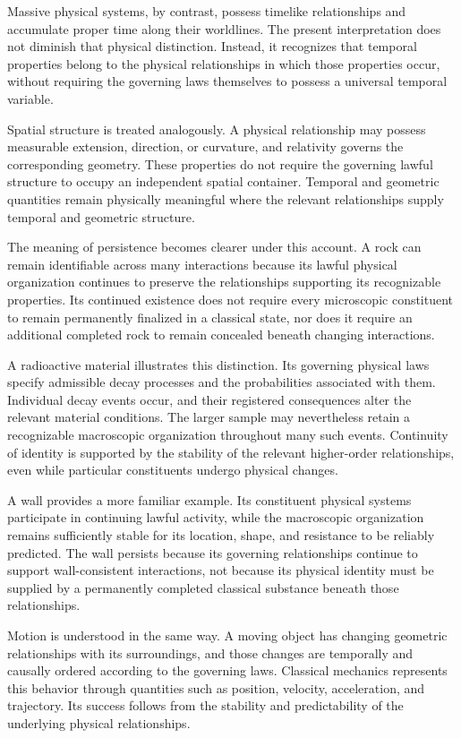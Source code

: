 \documentclass[12pt,onecolumn]{article}
\begin{document}
Massive physical systems, by contrast, possess timelike relationships and accumulate proper time along their worldlines. The present interpretation does not diminish that physical distinction. Instead, it recognizes that temporal properties belong to the physical relationships in which those properties occur, without requiring the governing laws themselves to possess a universal temporal variable.

Spatial structure is treated analogously. A physical relationship may possess measurable extension, direction, or curvature, and relativity governs the corresponding geometry. These properties do not require the governing lawful structure to occupy an independent spatial container. Temporal and geometric quantities remain physically meaningful where the relevant relationships supply temporal and geometric structure.

The meaning of persistence becomes clearer under this account. A rock can remain identifiable across many interactions because its lawful physical organization continues to preserve the relationships supporting its recognizable properties. Its continued existence does not require every microscopic constituent to remain permanently finalized in a classical state, nor does it require an additional completed rock to remain concealed beneath changing interactions.

A radioactive material illustrates this distinction. Its governing physical laws specify admissible decay processes and the probabilities associated with them. Individual decay events occur, and their registered consequences alter the relevant material conditions. The larger sample may nevertheless retain a recognizable macroscopic organization throughout many such events. Continuity of identity is supported by the stability of the relevant higher-order relationships, even while particular constituents undergo physical changes.

A wall provides a more familiar example. Its constituent physical systems participate in continuing lawful activity, while the macroscopic organization remains sufficiently stable for its location, shape, and resistance to be reliably predicted. The wall persists because its governing relationships continue to support wall-consistent interactions, not because its physical identity must be supplied by a permanently completed classical substance beneath those relationships.

Motion is understood in the same way. A moving object has changing geometric relationships with its surroundings, and those changes are temporally and causally ordered according to the governing laws. Classical mechanics represents this behavior through quantities such as position, velocity, acceleration, and trajectory. Its success follows from the stability and predictability of the underlying physical relationships.
\end{document}
